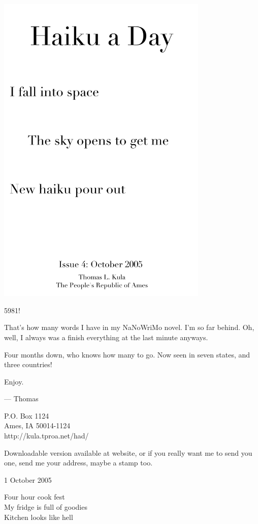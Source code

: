 \documentclass[12pt]{article}
\begin{document}
\includegraphics[width=101mm]{frontpage.png}

\newpage


5981!

That's how many words I have in my NaNoWriMo novel. I'm so far behind.
Oh, well, I always was a finish everything at the last minute anyways.

Four months down, who knows how many to go. Now seen in seven states,
and three countries!

Enjoy.

--- Thomas

P.O. Box 1124 \\
Ames, IA 50014-1124 \\
http://kula.tproa.net/had/

Downloadable version available at website, or if you really
want me to send you one, send me your address, maybe a
stamp too. \\

\setlength{\parskip}{1mm}

1 October 2005

Four hour cook fest \\
My fridge is full of goodies \\
Kitchen looks like hell \\
\end{document}

